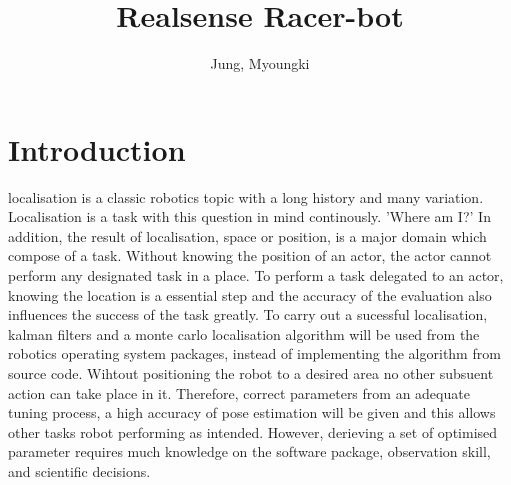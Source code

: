 \documentclass[10pt,journal,compsoc]{IEEEtran}
\begin{document}
\title{Realsense Racer-bot}

\author{Jung, Myoungki}

%
{}


\maketitle
\IEEEdisplaynontitleabstractindextext
\IEEEpeerreviewmaketitle
\section{Introduction}
\label{sec:introduction}

 localisation is a classic robotics topic with a long history and many variation. Localisation is a task with this question in mind continously.
'Where am I?' In addition, the result of localisation, space or position, is a major domain which compose of a task.
Without knowing the position of an actor, the actor cannot perform any designated task in a place. To perform a task delegated to an actor, knowing the location is a essential step and the accuracy of the evaluation also influences the success of the task greatly.
To carry out a sucessful localisation, kalman filters and a monte carlo localisation algorithm will be used from the robotics operating system packages, instead of implementing the algorithm from source code.
Wihtout positioning the robot to a desired area no other subsuent action can take place in it. Therefore, correct parameters from an adequate tuning process, a high accuracy of pose estimation will be given and this allows other tasks robot performing as intended. However, derieving a set of optimised parameter requires much knowledge on the software package, observation skill, and scientific decisions.
\end{document}

